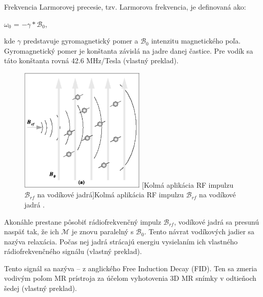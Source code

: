 \clearpage

Frekvencia Larmorovej precesie, tzv. Larmorova frekvencia, je definovaná ako:
\begin {center}
$\omega_{0}$ = $-\gamma * \mathcal{B}_{0}$,
\end {center}

kde $\gamma$ predstavuje gyromagnetický pomer a $\mathcal{B}_{0}$ intenzitu magnetického poľa.
Gyromagnetický pomer je konštanta závislá na jadre danej častice. \newline Pre vodík sa táto konštanta rovná 42.6 MHz/Tesla \cite{basic_principles_of_mri} (vlastný preklad).

\begin {figure}[H]
        \centering
        \includegraphics[height=6cm]{media/hydrogen/hydrogen_reacting_to_rf.png}
        \captionsetup{justification=centering}
        [Kolmá aplikácia RF impulzu $\mathcal{B}_{rf}$ na vodíkové jadrá]{Kolmá aplikácia RF impulzu $\mathcal{B}_{rf}$ na vodíkové jadrá \cite{basic_principles_of_mri}.}
\end {figure}

Akonáhle prestane pôsobiť rádiofrekvenčný impulz $\mathcal{B}_{rf}$, vodíkové jadrá sa presunú naspäť tak, že ich $\mathcal{M}$ je znovu paralelný s $\mathcal{B}_{0}$. Tento návrat vodíkových jadier sa nazýva relaxácia. Počas nej jadrá strácajú energiu vysielaním ich vlastného rádiofrekvenčného signálu  \cite{basic_principles_of_mri} (vlastný preklad).

Tento signál sa nazýva  -- z anglického Free Induction Decay (FID). Ten sa zmeria vodivým poľom MR prístroja za účelom vyhotovenia 3D MR snímky v odtieňoch šedej \cite{basic_principles_of_mri} (vlastný preklad).

